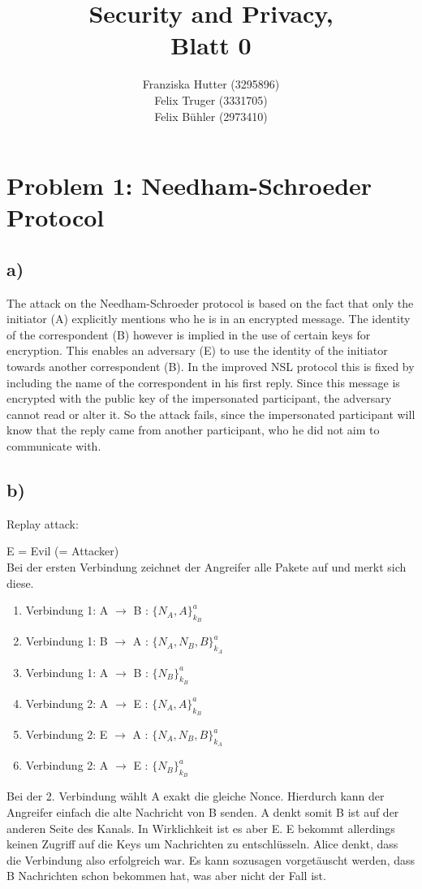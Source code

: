 \documentclass[12pt,pdftex,a4paper]{article}
\title{Security and Privacy,\\ Blatt 0}
\author{Franziska Hutter (3295896)\\
	Felix Truger (3331705)\\
	Felix Bühler (2973410)}
\newcommand\tab[1][1cm]{\hspace*{#1}}
\begin{document}
\maketitle
\pagebreak

\section*{Problem 1: Needham-Schroeder Protocol}

\subsection*{a)}
The attack on the Needham-Schroeder protocol is based on the fact that only the initiator (A) explicitly mentions who he is in an encrypted message. The identity of the correspondent (B) however is implied in the use of certain keys for encryption. This enables an adversary (E) to use the identity of the initiator towards another correspondent (B). In the improved NSL protocol this is fixed by including the name of the correspondent in his first reply. Since this message is encrypted with the public key of the impersonated participant, the adversary cannot read or alter it. So the attack fails, since the impersonated participant will know that the reply came from another participant, who he did not aim to communicate with.

\subsection*{b)}
Replay attack:

E = Evil (= Attacker)\\
Bei der ersten Verbindung zeichnet der Angreifer alle Pakete auf und merkt sich diese.
\begin{enumerate}
	\item Verbindung 1: A $ \rightarrow $ B \tab : $ \{N_A, A\}^a_{k_B} $
	\item Verbindung 1: B $ \rightarrow $ A \tab : $ \{N_A, N_B, B\}^a_{k_A} $
	\item Verbindung 1: A $ \rightarrow $ B \tab : $ \{N_B\}^a_{k_B} $
	\setlength{\itemsep}{20pt}
	\item Verbindung 2: A $ \rightarrow $ E \tab : $ \{N_A, A\}^a_{k_B} $
	\setlength{\itemsep}{5pt}
	\item Verbindung 2: E $ \rightarrow $ A \tab : $ \{N_A, N_B, B\}^a_{k_A} $
	\item Verbindung 2: A $ \rightarrow $ E \tab : $ \{N_B\}^a_{k_B} $
\end{enumerate}
Bei der 2. Verbindung wählt A exakt die gleiche Nonce. Hierdurch kann der Angreifer einfach die alte Nachricht von B senden. A denkt somit B ist auf der anderen Seite des Kanals. In Wirklichkeit ist es aber E. E bekommt allerdings keinen Zugriff auf die Keys um Nachrichten zu entschlüsseln. Alice denkt, dass die Verbindung also erfolgreich war. Es kann sozusagen vorgetäuscht werden, dass B Nachrichten schon bekommen hat, was aber nicht der Fall ist.
\end{document}
